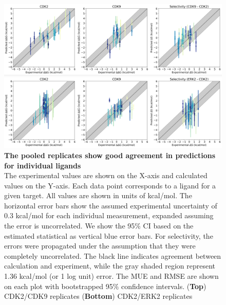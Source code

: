 \documentclass[phd,tocprelim]{cornell}
\begin{document}
\begin{appendices}
	\begin{landscape}
		\begin{figure}[p]
			\centering
			\includegraphics[width=0.7\linewidth]{figures/supp_figure8.pdf}
			\caption[The pooled replicates show good agreement in predictions for individual ligands]{
				{\bf The pooled replicates show good agreement in predictions for individual ligands} \\
				The experimental values are shown on the X-axis and calculated values on the Y-axis. Each data point corresponds to a ligand for a given target. All values are shown in units of kcal/mol. The horizontal error bars show the assumed experimental uncertainty of 0.3 kcal/mol\citep{BROWN2009420} for each individual measurement, expanded assuming the error is uncorrelated. We show the 95\% CI based on the estimated statistical as vertical blue error bars. For selectivity, the errors were propagated under the assumption that they were completely uncorrelated. The black line indicates agreement between calculation and experiment, while the gray shaded region represent 1.36 kcal/mol (or 1 log unit) error. The MUE and RMSE are shown on each plot with bootstrapped 95$\%$ confidence intervals. ({\bf Top}) CDK2/CDK9 replicates ({\bf Bottom}) CDK2/ERK2 replicates
			}
			\label{fig:sup-figure-8}
		\end{figure}
	\end{landscape}
	

\end{appendices}
\end{document}
